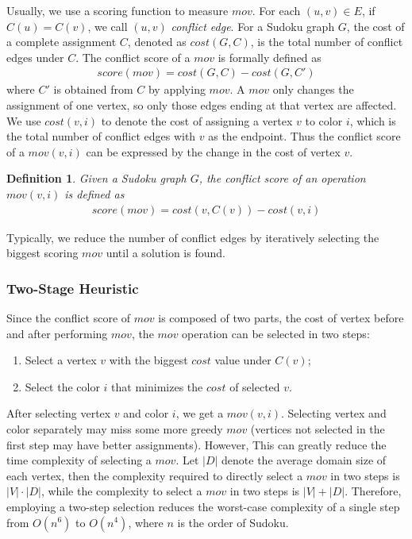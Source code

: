 \documentclass{article}
\newtheorem{Definition}{Definition}
\begin{document}
Usually, we use a scoring function to measure $mov$. For each $(u,v) \in E$, if $C(u) = C(v)$, we call $(u,v)$ {\it conflict edge}. For a Sudoku graph $G$, the cost of a complete assignment $C$, denoted as $cost(G,C)$, is the total number of conflict edges under $C$. The conflict score of a $mov$ is formally defined as%
%
\begin{align}
    score(mov) = cost(G, C) - cost(G, C')
\end{align}%
where $C'$ is obtained from $C$ by applying $mov$. A $mov$ only changes the assignment of one vertex, so only those edges ending at that vertex are affected. We use $cost(v,i)$ to denote the cost of assigning a vertex $v$ to color $i$, which is the total number of conflict edges with $v$ as the endpoint. Thus the conflict score of a $mov(v,i)$ can be expressed by the change in the cost of vertex $v$.

\begin{Definition}
Given a Sudoku graph $G$, the conflict score of an operation $mov(v, i)$ is defined as 
\begin{align}
    score(mov) = cost(v, C(v)) - cost(v, i)
\end{align}%
\end{Definition}

Typically, we reduce the number of conflict edges by iteratively selecting the biggest scoring $mov$ until a solution is found.

\subsubsection{Two-Stage Heuristic}

Since the conflict score of $mov$ is composed of two parts, the cost of vertex before and after performing $mov$, the $mov$ operation can be selected in two steps:

\begin{enumerate}
    \item Select a vertex $v$ with the biggest $cost$ value under $C(v)$;
    \item Select the color $i$ that minimizes the $cost$ of selected $v$.
\end{enumerate}

After selecting vertex $v$ and color $i$, we get a $mov(v, i)$. Selecting vertex and color separately may miss some more greedy $mov$ (vertices not selected in the first step may have better assignments). However, This can greatly reduce the time complexity of selecting a $mov$. Let $|D|$ denote the average domain size of each vertex, then the complexity required to directly select a $mov$ in two steps is $|V|\cdot |D|$, while the complexity to select a $mov$ in two steps is $|V|+|D|$. Therefore, employing a two-step selection reduces the worst-case complexity of a single step from $O(n^6)$ to $O(n^4)$, where $n$ is the order of Sudoku.
\end{document}
